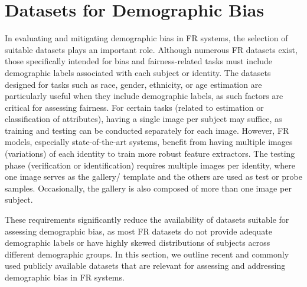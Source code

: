 \section{Datasets for Demographic Bias}
\label{sec:datasets}

In evaluating and mitigating demographic bias in FR systems, the selection of
suitable datasets plays an important role. Although numerous FR datasets exist,
those specifically intended for bias and fairness-related tasks must include
demographic labels associated with each subject or identity. The datasets
designed for tasks such as race, gender, ethnicity, or age estimation are
particularly useful when they include demographic labels, as such factors are
critical for assessing fairness. For certain tasks (related to estimation or
classification of attributes), having a single image per subject may suffice, as
training and testing can be conducted separately for each image. However, FR
models, especially state-of-the-art systems, benefit from having multiple images
(variations) of each identity to train more robust feature extractors. The
testing phase (verification or identification) requires multiple images per
identity, where one image serves as the gallery/ template and the others are
used as test or probe samples. Occasionally, the gallery is also composed of
more than one image per subject. 



These requirements significantly reduce the availability of datasets suitable
for assessing demographic bias, as most FR datasets do not provide adequate
demographic labels or have highly skewed distributions of subjects across
different demographic groups. In this section, we outline recent and commonly
used publicly available datasets that are relevant for assessing and addressing
demographic bias in FR systems.

